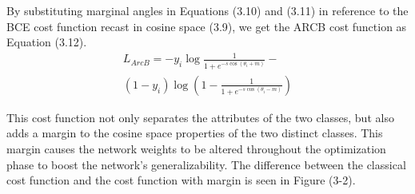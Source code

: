 \documentclass[journal]{IEEEtran}
\begin{document}
By substituting marginal angles in Equations (3.10) and (3.11) in reference to the BCE cost function recast in cosine space (3.9), we get the ARCB cost function as Equation (3.12).
\begin{multline}\label{eq:arcb}
	L_{ArcB} = -y_i \log{\frac{1}{1+e^{-s\cos{(\theta_i+m)}}}} -\\ (1-y_i)\log{(1-\frac{1}{1+e^{-s\cos{(\theta_i-m)}}} )}
\end{multline}

This cost function not only separates the attributes of the two classes, but also adds a margin to the cosine space properties of the two distinct classes. This margin causes the network weights to be altered throughout the optimization phase to boost the network's generalizability. The difference between the classical cost function and the cost function with margin is seen in Figure (3-2).
\end{document}
